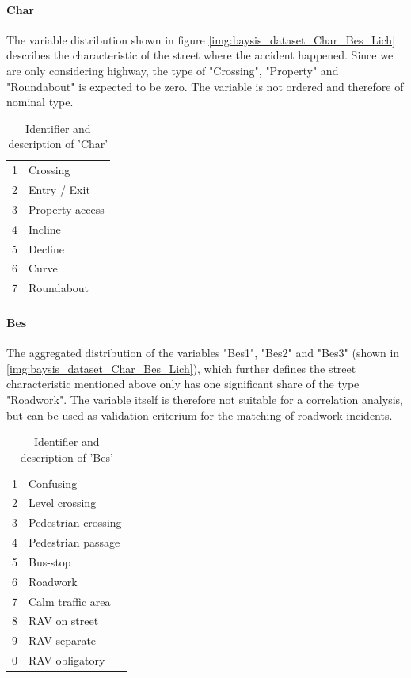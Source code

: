 \paragraph{Char}
The variable distribution shown in figure \autoref{img:baysis_dataset_Char_Bes_Lich} describes the characteristic of the street where the accident happened. Since we are only considering highway, the type of "Crossing", "Property" and "Roundabout" is expected to be zero. The variable is not ordered and therefore of nominal type.  
\noindent
\begin{table}[ht]
	\centering
	\begin{tabular}{c|l}  
		1 & Crossing \\
	    2 & Entry / Exit \\
	    3 & Property access \\
	    4 & Incline \\
	    5 & Decline \\
	    6 & Curve \\
	    7 & Roundabout \\
	\end{tabular}
	\caption{Identifier and description of 'Char'}
	\label{table:baysis_dataset_Char}
\end{table}

\paragraph{Bes}
The aggregated distribution of the variables "Bes1", "Bes2" and "Bes3" (shown in \autoref{img:baysis_dataset_Char_Bes_Lich}), which further defines the street characteristic mentioned above only has one significant share of the type "Roadwork". The variable itself is therefore not suitable for a correlation analysis, but can be used as validation criterium for the matching of roadwork incidents.
\noindent
\begin{table}[ht]
	\centering
	\begin{tabular}{c|l}  
		1 & Confusing \\ 
		2 & Level crossing \\
		3 & Pedestrian crossing \\
		4 & Pedestrian passage \\
		5 & Bus-stop \\
		6 & Roadwork \\
		7 & Calm traffic area \\
		8 & RAV on street \\
		9 & RAV separate \\
		0 & RAV obligatory \\
	\end{tabular}
	\caption{Identifier and description of 'Bes'}
	\label{table:baysis_dataset_Bes}
\end{table}

